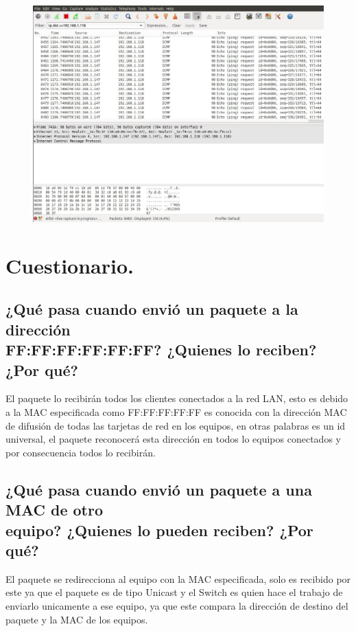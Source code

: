 \documentclass{udpreport}
\begin{document}
\begin{figure}[H]
    \centering
    \includegraphics[scale=0.4]{images/wiredef.png}
    \label{fig:my_label}
\end{figure}

\chapter{Cuestionario.}
\section{¿Qué pasa cuando envió un paquete a la dirección\\ FF:FF:FF:FF:FF:FF? ¿Quienes
lo reciben? ¿Por qué?}

El paquete lo recibirán todos los clientes conectados a la red LAN, esto es debido a la MAC especificada como FF:FF:FF:FF:FF es conocida con la dirección MAC de difusión de todas las tarjetas de red en los equipos, en otras palabras es un id universal, el paquete reconocerá esta dirección  en todos lo equipos conectados y por consecuencia todos lo recibirán.

\section{¿Qué pasa cuando envió un paquete a una MAC de otro\\ equipo? ¿Quienes lo
pueden reciben? ¿Por qué?}
El paquete se redirecciona al equipo con la MAC especificada, solo es recibido por este ya que el paquete es de tipo Unicast y el Switch es quien hace el trabajo de enviarlo unicamente a ese equipo, ya que este compara la dirección de destino del paquete y la MAC de los equipos.
\end{document}
